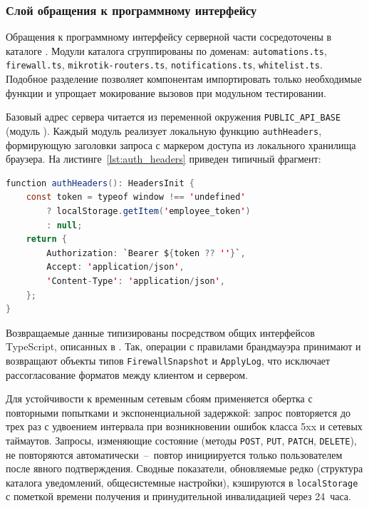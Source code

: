 \subsubsection{Слой обращения к программному интерфейсу}

Обращения к программному интерфейсу серверной части сосредоточены в каталоге . Модули каталога сгруппированы по доменам: \texttt{automations.ts}, \texttt{firewall.ts}, \texttt{mikrotik-routers.ts}, \texttt{notifications.ts}, \texttt{whitelist.ts}. Подобное разделение позволяет компонентам импортировать только необходимые функции и упрощает мокирование вызовов при модульном тестировании.

Базовый адрес сервера читается из переменной окружения \texttt{PUBLIC\_API\_BASE} (модуль ). Каждый модуль реализует локальную функцию \texttt{authHeaders}, формирующую заголовки запроса с маркером доступа из локального хранилища браузера. На листинге~\ref{lst:auth_headers} приведен типичный фрагмент:

\begin{lstlisting}[language=Java,caption={Формирование заголовков с маркером Sanctum},label={lst:auth_headers}]
function authHeaders(): HeadersInit {
    const token = typeof window !== 'undefined'
        ? localStorage.getItem('employee_token')
        : null;
    return {
        Authorization: `Bearer ${token ?? ''}`,
        Accept: 'application/json',
        'Content-Type': 'application/json',
    };
}
\end{lstlisting}

Возвращаемые данные типизированы посредством общих интерфейсов TypeScript, описанных в . Так, операции с правилами брандмауэра принимают и возвращают объекты типов \texttt{FirewallSnapshot} и \texttt{ApplyLog}, что исключает рассогласование форматов между клиентом и сервером.

Для устойчивости к временным сетевым сбоям применяется обертка с повторными попытками и экспоненциальной задержкой: запрос повторяется до трех раз с удвоением интервала при возникновении ошибок класса 5xx и сетевых таймаутов. Запросы, изменяющие состояние (методы \texttt{POST}, \texttt{PUT}, \texttt{PATCH}, \texttt{DELETE}), не повторяются автоматически~--~повтор инициируется только пользователем после явного подтверждения. Сводные показатели, обновляемые редко (структура каталога уведомлений, общесистемные настройки), кэшируются в \texttt{localStorage} с пометкой времени получения и принудительной инвалидацией через 24~часа.

